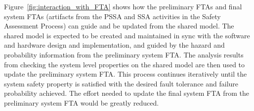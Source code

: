 Figure~\ref{fig:interaction_with_FTA} shows how the preliminary FTAs and final system FTAs (artifacts from the PSSA and SSA activities in the Safety Assessment Process) can guide and be updated from the shared model.
The shared model is expected to be created and maintained in sync with the software and hardware design and implementation, and guided by the hazard and probability information from the preliminary system FTA. The analysis results from checking the system level properties on the shared model are then used to update the preliminary system FTA. This process continues iteratively until the system safety property is satisfied with the desired fault tolerance and failure probability achieved. The effort needed to update the final system FTA from the preliminary system FTA would be greatly reduced.


